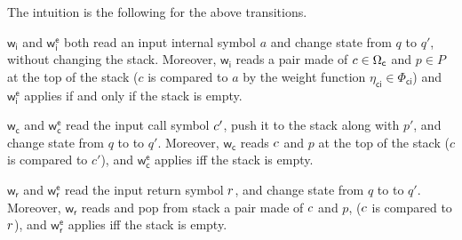 \documentclass[runningheads]{llncs}
\newcommand{\zero}{\mathbb{0}}
\def\wei{\mathsf{w}}
\newcommand{\call}[1]{\ensuremath #1} %
\newcommand{\return}[1]{\ensuremath #1} %
\def\Omegac{{\Omega_\mathsf{c}}}
\def\Phici{{\Phi_\mathsf{ci}}}
\def\weii{{\wei_\mathsf{i}}}
\def\weic{{\wei_\mathsf{c}}}
\def\weir{{\wei_\mathsf{r}}}
\def\weiei{{\wei^\mathsf{e}_\mathsf{i}}}
\def\weiec{{\wei^\mathsf{e}_\mathsf{c}}}
\def\weier{{\wei^\mathsf{e}_\mathsf{r}}}
\begin{document}
\noindent
The intuition is the following for the above transitions.

\noindent
$\weii$ and $\weiei$ both read an input internal symbol $a$ and change state from $q$ to $q'$, 
without changing the stack. 
Moreover, $\weii$ reads a pair made of 
${\call{c}} \in \Omegac$ and $p \in P$ at the top of the stack 
($c$ is compared to $a$ by the weight function $\eta_\mathsf{ci} \in \Phici$)
and $\weiei$ applies if and only if the stack is empty.

\noindent
$\weic$ and $\weiec$ read the input call symbol $\call{c}'$, 
push it to the stack along with $p'$, and change state from $q$ to to $q'$.
Moreover, $\weic$ reads ${\call{c}}$ and $p$ at the top of the stack 
($c$ is compared to $c'$),
and $\weiec$ applies iff the stack is empty.

\noindent
$\weir$ and $\weier$ read the input return symbol $\return{r}$, and change state from $q$ to to $q'$.
Moreover, $\weir$ reads and pop from stack a pair made of $\call{c}$ and $p$, 
($\call{c}$ is compared to $\return{r}$),
and $\weier$ applies iff the stack is empty.
\end{document}
